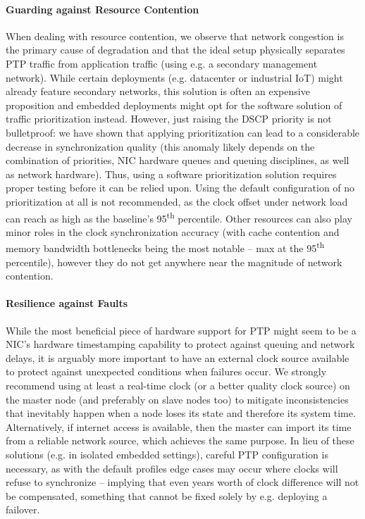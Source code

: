 \paragraph{Guarding against Resource Contention}
When dealing with resource contention, we observe that network congestion is the primary cause of degradation and that the ideal setup physically separates PTP traffic from application traffic (using e.g. a secondary management network). While certain deployments (e.g. datacenter or industrial IoT) might already feature secondary networks, this solution is often an expensive proposition and embedded deployments might opt for the software solution of traffic prioritization instead. However, just raising the DSCP priority is not bulletproof: we have shown that applying prioritization can lead to a considerable decrease in synchronization quality (this anomaly likely depends on the combination of priorities, NIC hardware queues and queuing disciplines, as well as network hardware). Thus, using a software prioritization solution requires proper testing before it can be relied upon. Using the default configuration of no prioritization at all is not recommended, as the \PNineFive{} clock offset under network load can reach as high as \fRatio[-2]{\cmpMax} the baseline's 95\textsuperscript{th} percentile. Other resources can also play minor roles in the clock synchronization accuracy (with cache contention and memory bandwidth bottlenecks being the most notable -- max  at the 95\textsuperscript{th} percentile), however they do not get anywhere near the magnitude of network contention.

\paragraph{Resilience against Faults} While the most beneficial piece of hardware support for PTP might seem to be a NIC's hardware timestamping capability to protect against queuing and network delays, it is arguably more important to have an external clock source available to protect against unexpected conditions when failures occur. We strongly recommend using at least a real-time clock (or a better quality clock source) on the master node (and preferably on slave nodes too) to mitigate inconsistencies that inevitably happen when a node loses its state and therefore its system time. Alternatively, if internet access is available, then the master can import its time from a reliable network source, which achieves the same purpose. In lieu of these solutions (e.g. in isolated embedded settings), careful PTP configuration is necessary, as with the default profiles edge cases may occur where clocks will refuse to synchronize -- implying that even years worth of clock difference will not be compensated, something that cannot be fixed solely by e.g. deploying a failover.

